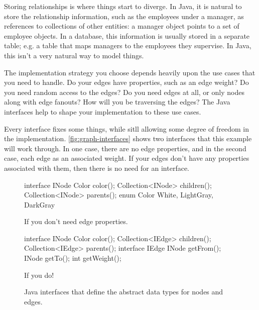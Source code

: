 Storing relationships is where things start to diverge. In Java, it is natural
to store the relationship information, such as the employees under a manager, as
references to collections of other entities: a manager object points to a set of
employee objects. In a database, this information is usually stored in a
separate table; e.g. a table that maps managers to the employees they supervise.
In Java, this isn't a very natural way to model things.

The implementation strategy you choose depends heavily upon the use cases that
you need to handle. Do your edges have properties, such as an edge weight? Do
you need random access to the edges? Do you need edges at all, or only nodes
along with edge fanouts? How will you be traversing the edges? The Java
interfaces help to shape your implementation to these use cases.

Every interface fixes some things, while sitll allowing some degree of freedom
in the implementation. \autoref{fig:graph-interfaces} shows two interfaces that
this example will work through. In one case, there are no edge properties, and
in the second case, each edge as an associated weight. If your edges don't have
any properties associated with them, then there is no need for an 
interface. 

\begin{figure}
\centering
\begin{subfloat}
\label{fig:graph-interfaces}
\begin{minipage}[b]{0.45\textwidth}
\begin{framedlisting}
interface INode {
  Color color();
  Collection<INode> children();
  Collection<INode> parents();
}
enum Color {
  White, LightGray, DarkGray
}
\end{framedlisting}
\end{minipage}
\caption{If you don't need edge properties.}
\end{subfloat}
\begin{subfloat}
\label{fig:graph-interfaces}
\begin{minipage}[b]{0.45\textwidth}
\begin{framedlisting}
interface INode {
  Color color();
  Collection<IEdge> children();
  Collection<IEdge> parents();
}
interface IEdge {
   INode getFrom();
   INode getTo();
   int getWeight();
}
\end{framedlisting}
\end{minipage}
\caption{If you do!}
\end{subfloat}
\caption{Java interfaces that define the abstract data types for nodes and
edges.}
\label{fig:graph-interfaces}
\end{figure}

